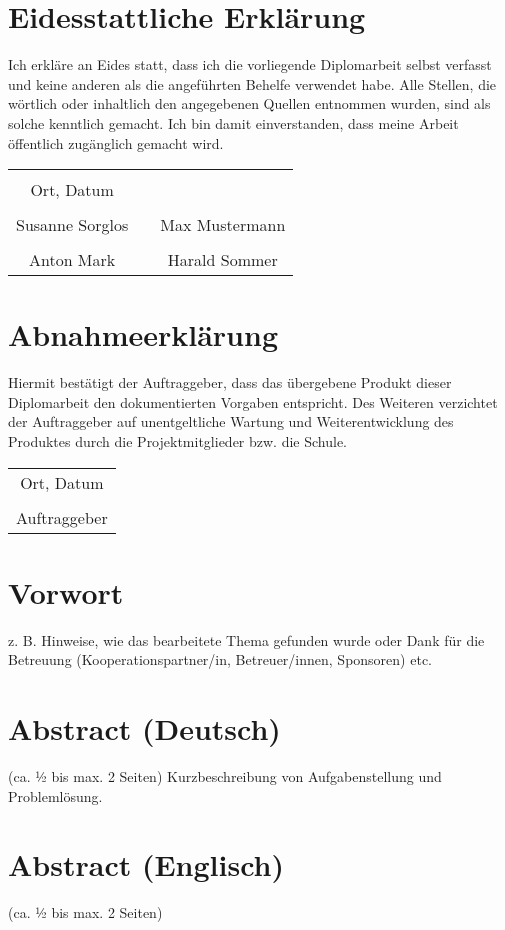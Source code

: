 \chapter*{Eidesstattliche Erklärung}
Ich erkläre an Eides statt, dass ich die vorliegende Diplomarbeit selbst
verfasst und keine anderen als die angeführten Behelfe verwendet habe. Alle Stellen, die wörtlich oder inhaltlich den angegebenen Quellen entnommen wurden, sind als solche kenntlich gemacht.
Ich bin damit einverstanden, dass meine Arbeit öffentlich zugänglich gemacht wird.

\vspace{1cm}
\begin{tabular}{c c c}
	                & \hspace{4cm} &                \\\cline{1-1}
	Ort, Datum      &              &                \\
	\vspace{2cm}
	                &              &                \\\cline{1-1}\cline{3-3}
	Susanne Sorglos &              & Max Mustermann \\ 
	\vspace{2cm}
	                &              &                \\\cline{1-1}\cline{3-3}
	Anton Mark      &              & Harald Sommer  \\ 
\end{tabular}

\chapter*{Abnahmeerklärung}
Hiermit bestätigt der Auftraggeber, dass das übergebene Produkt dieser Diplomarbeit den dokumentierten Vorgaben entspricht. Des Weiteren verzichtet der Auftraggeber auf unentgeltliche Wartung und Weiterentwicklung des Produktes durch die Projektmitglieder bzw. die Schule.

\vspace{1cm}
\begin{tabular}{c}
	\\\cline{1-1}
	Ort, Datum \\
	\vspace{2cm}
	\\\cline{1-1}
	Auftraggeber
\end{tabular}

\chapter*{Vorwort}
z. B. Hinweise, wie das bearbeitete Thema gefunden wurde oder Dank für die Betreuung (Kooperationspartner/in, Betreuer/innen, Sponsoren) etc.


\chapter*{Abstract (Deutsch)}
 (ca. ½ bis max. 2 Seiten)
Kurzbeschreibung von Aufgabenstellung und Problemlösung.

\chapter*{Abstract (Englisch)}
 (ca. ½ bis max. 2 Seiten)